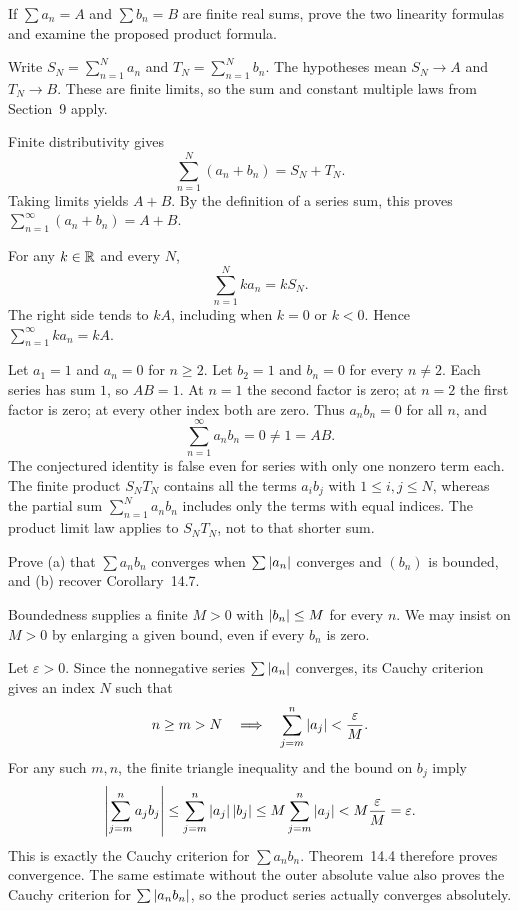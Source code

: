 \goal If $\sum a_n=A$ and $\sum b_n=B$ are finite real sums,
prove the two linearity formulas and examine the proposed product
formula.

Write $S_N=\sum_{n=1}^{N}a_n$ and $T_N=\sum_{n=1}^{N}b_n$.
The hypotheses mean $S_N\to A$ and $T_N\to B$. These are finite
limits, so the sum and constant multiple laws from Section~9 apply.

Finite distributivity gives
\[
 \sum_{n=1}^{N}(a_n+b_n)=S_N+T_N.
\]
Taking limits yields $A+B$. By the definition of a series sum,
this proves $\sum_{n=1}^{\infty}(a_n+b_n)=A+B$.

For any $k\in\mathbb{R}$ and every $N$,
\[
 \sum_{n=1}^{N}ka_n=kS_N.
\]
The right side tends to $kA$, including when $k=0$ or $k<0$.
Hence $\sum_{n=1}^{\infty}ka_n=kA$.

Let $a_1=1$ and $a_n=0$ for $n\ge2$. Let $b_2=1$ and
$b_n=0$ for every $n\ne2$. Each series has sum $1$, so $AB=1$.
At $n=1$ the second factor is zero; at $n=2$ the first factor is
zero; at every other index both are zero. Thus $a_nb_n=0$ for
all $n$, and
\[
 \sum_{n=1}^{\infty}a_nb_n=0\ne1=AB.
\]
The conjectured identity is false even for series with only one
nonzero term each. The finite product $S_NT_N$ contains all the
terms $a_i b_j$ with $1\le i,j\le N$, whereas the partial sum
$\sum_{n=1}^{N}a_nb_n$ includes only the terms with equal indices.
The product limit law applies to $S_NT_N$, not to that shorter sum.

\goal Prove (a) that $\sum a_nb_n$ converges when
$\sum\left|a_n\right|$ converges and $(b_n)$ is bounded, and (b) recover
Corollary~14.7.

Boundedness supplies a finite $M>0$ with $\left|b_n\right|\le M$ for
every $n$. We may insist on $M>0$ by enlarging a given bound,
even if every $b_n$ is zero.

Let $\varepsilon>0$. Since the nonnegative series
$\sum\left|a_n\right|$ converges, its Cauchy criterion gives an index
$N$ such that
\[
 n\ge m>N\quad\Longrightarrow\quad
 \sum_{j=m}^{n}\left|a_j\right|<\frac{\varepsilon}{M}.
\]
For any such $m,n$, the finite triangle inequality and the bound
on $b_j$ imply
\[
 \left|\sum_{j=m}^{n}a_jb_j\right|
 \le\sum_{j=m}^{n}\left|a_j\right|\left|b_j\right|
 \le M\sum_{j=m}^{n}\left|a_j\right|
 <M\frac{\varepsilon}{M}=\varepsilon.
\]
This is exactly the Cauchy criterion for $\sum a_nb_n$.
Theorem~14.4 therefore proves convergence. The same estimate
without the outer absolute value also proves the Cauchy criterion
for $\sum\left|a_nb_n\right|$, so the product series actually converges
absolutely.

